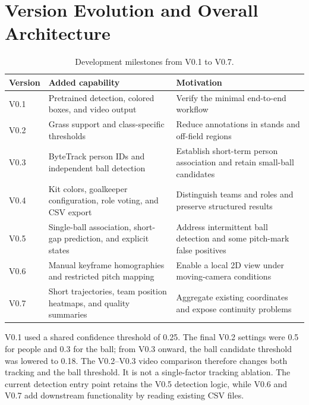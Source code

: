 \documentclass[11pt,a4paper]{article}
\begin{document}
\section{Version Evolution and Overall Architecture}

\begin{table}[htbp]
\centering
\caption{Development milestones from V0.1 to V0.7.}
\label{tab:versions}
\small
\begin{tabularx}{\linewidth}{@{}lLL@{}}
\toprule
Version & Added capability & Motivation\\
\midrule
V0.1 & Pretrained detection, colored boxes, and video output
     & Verify the minimal end-to-end workflow\\
V0.2 & Grass support and class-specific thresholds
     & Reduce annotations in stands and off-field regions\\
V0.3 & ByteTrack person IDs and independent ball detection
     & Establish short-term person association and retain small-ball candidates\\
V0.4 & Kit colors, goalkeeper configuration, role voting, and CSV export
     & Distinguish teams and roles and preserve structured results\\
V0.5 & Single-ball association, short-gap prediction, and explicit states
     & Address intermittent ball detection and some pitch-mark false positives\\
V0.6 & Manual keyframe homographies and restricted pitch mapping
     & Enable a local 2D view under moving-camera conditions\\
V0.7 & Short trajectories, team position heatmaps, and quality summaries
     & Aggregate existing coordinates and expose continuity problems\\
\bottomrule
\end{tabularx}
\end{table}

V0.1 used a shared confidence threshold of 0.25. The final V0.2 settings were
0.5 for people and 0.3 for the ball; from V0.3 onward, the ball candidate
threshold was lowered to 0.18. The V0.2--V0.3 video comparison therefore changes
both tracking and the ball threshold. It is not a single-factor tracking
ablation. The current detection entry point retains the V0.5 detection logic,
while V0.6 and V0.7 add downstream functionality by reading existing CSV files.
\end{document}
